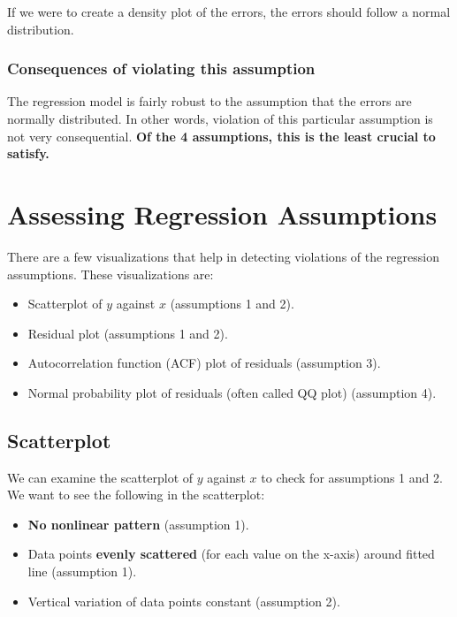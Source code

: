 \documentclass[
]{book}
\providecommand{\tightlist}{%
  \setlength{\itemsep}{0pt}\setlength{\parskip}{0pt}}
\begin{document}
If we were to create a density plot of the errors, the errors should follow a normal distribution.

\hypertarget{consequences-of-violating-this-assumption-3}{%
\subsubsection{Consequences of violating this assumption}\label{consequences-of-violating-this-assumption-3}}

The regression model is fairly robust to the assumption that the errors are normally distributed. In other words, violation of this particular assumption is not very consequential. \textbf{Of the 4 assumptions, this is the least crucial to satisfy.}

\hypertarget{assessing-regression-assumptions}{%
\section{Assessing Regression Assumptions}\label{assessing-regression-assumptions}}

There are a few visualizations that help in detecting violations of the regression assumptions. These visualizations are:

\begin{itemize}
\tightlist
\item
  Scatterplot of \(y\) against \(x\) (assumptions 1 and 2).
\item
  Residual plot (assumptions 1 and 2).
\item
  Autocorrelation function (ACF) plot of residuals (assumption 3).
\item
  Normal probability plot of residuals (often called QQ plot) (assumption 4).
\end{itemize}

\hypertarget{scatterplot}{%
\subsection{Scatterplot}\label{scatterplot}}

We can examine the scatterplot of \(y\) against \(x\) to check for assumptions 1 and 2. We want to see the following in the scatterplot:

\begin{itemize}
\tightlist
\item
  \textbf{No nonlinear pattern} (assumption 1).
\item
  Data points \textbf{evenly scattered} (for each value on the x-axis) around fitted line (assumption 1).
\item
  Vertical variation of data points constant (assumption 2).
\end{itemize}
\end{document}
